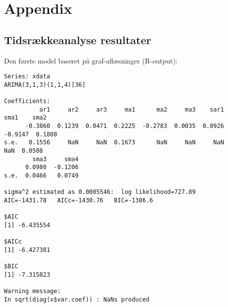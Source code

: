 \section{Appendix}


\subsection{Tidsrækkeanalyse resultater}
\label{first-R}

Den første model baseret på graf-aflæsninger (R-output):

\begin{minipage}{1.3\textwidth}
\begin{lstlisting}
Series: xdata 
ARIMA(3,1,3)(1,1,4)[36]                    

Coefficients:
          ar1     ar2     ar3     ma1      ma2     ma3    sar1     sma1    sma2
      -0.3860  0.1239  0.0471  0.2225  -0.2783  0.0035  0.0926  -0.9147  0.1808
s.e.   0.1556     NaN     NaN  0.1673      NaN     NaN     NaN      NaN  0.0508
        sma3     sma4
      0.0980  -0.1206
s.e.  0.0466   0.0749

sigma^2 estimated as 0.0005546:  log likelihood=727.89
AIC=-1431.78   AICc=-1430.76   BIC=-1386.6

$AIC
[1] -6.435554

$AICc
[1] -6.427381

$BIC
[1] -7.315823

Warning message:
In sqrt(diag(x$var.coef)) : NaNs produced
\end{lstlisting}
\end{minipage}
